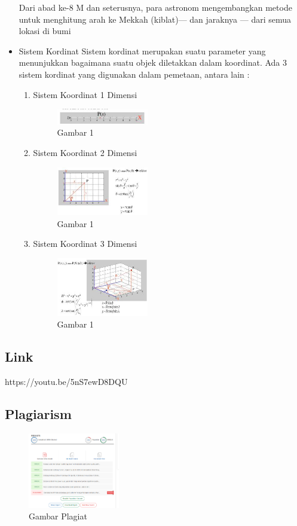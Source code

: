 \begin{itemize}
Dari abad ke-8 M dan seterusnya, para astronom mengembangkan metode untuk menghitung arah ke Mekkah (kiblat)— dan jaraknya — dari semua lokasi di bumi

	\item Sistem Kordinat 
Sistem kordinat merupakan suatu parameter yang menunjukkan bagaimana suatu objek diletakkan dalam koordinat. Ada 3 sistem kordinat yang digunakan dalam pemetaan, antara lain :


	\begin{enumerate}
	\item Sistem Koordinat 1 Dimensi
	
	\begin{figure}[H]
	\includegraphics[width=4cm]{figures/Tugas1/1174074/dimensi1.jpg}
	\centering
	\caption{Gambar 1}
\end{figure}
	
	\item Sistem Koordinat 2 Dimensi 

	\begin{figure}[H]
	\includegraphics[width=4cm]{figures/Tugas1/1174074/dimensi2.jpg}
	\centering
	\caption{Gambar 1}
\end{figure}

\item Sistem Koordinat 3 Dimensi

	\begin{figure}[H]
	\includegraphics[width=4cm]{figures/Tugas1/1174074/dimensi3.jpg}
	\centering
	\caption{Gambar 1}
\end{figure}

	\end{enumerate}
\end{itemize}
\subsection{Link}
https://youtu.be/5nS7ewD8DQU
\subsection{Plagiarism}
\begin{figure}[H]
	\includegraphics[width=4cm]{figures/Tugas1/1174074/plagiat.png}
	\centering
	\caption{Gambar Plagiat}
\end{figure}

	
